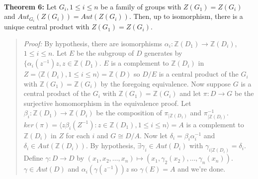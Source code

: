 \\
{\bf Theorem 6:}
Let $G_i, 1 \le i \le n$ be a family of groups with $Z(G_1)=Z(G_i)$ and
$Aut_{G_i}(Z(G_i))=Aut(Z(G_i))$.  Then, up to isomorphism, there is a unique
central product with $Z(G_1)=Z(G_i)$.
\begin{quote}
\emph{Proof:}
By hypothesis, there are isomorphisms
$\alpha_i : {\mathbb Z}( D_1 ) \rightarrow {\mathbb Z}( D_i )$, $1 \le i \le n$.
Let $E$ be the subgroup of $D$ generates by $\{ \alpha_i (z^{-1})z, z \in {\mathbb Z}(D_1 )$.
$E$ is a complement to ${\mathbb Z}(D_i)$ in $Z= \langle {\mathbb Z}(D_i), 1 \le i \le n \rangle = {\mathbb Z}(D)$ so
$D/E$ is a central product of the $G_i$ with ${\mathbb Z}(G_1 ) = {\mathbb Z}(G_i )$ by
the foregoing equivalence.  Now suppose $G$ is a central product of the $G_i$ with
${\mathbb Z}(G_1 ) = {\mathbb Z}(G_i )$ and let $\pi: D \rightarrow G$ be the surjective
homomorphism in the equivalence proof.  Let $\beta_i : {\mathbb Z}(D_1 ) \rightarrow {\mathbb Z}(D_i )$ be the composition of
$\pi_{|{\mathbb Z}(D_1 )}$ and $\pi_{|{\mathbb Z}(D_i )}^{-1}$.
$ker(\pi ) = \langle z \beta_i(Z^{-1} ): z \in {\mathbb Z}(D_1 ), 1 \le i \le n \rangle
= A$ is a complement
to ${\mathbb Z}(D_i )$ in $Z$ for each $i$ and $G \cong D/A$.  Now let $\delta_i = \beta_i \alpha_i^{-1}$ and $\delta_i \in Aut({\mathbb Z}(D_i ))$.  By
hypothesis, $\exists \gamma_i \in Aut( D_i )$ with $\gamma_{i | {\mathbb Z}(D_i )}= \delta_i$.
Define $\gamma : D \rightarrow D$ by $(x_1 , x_2 , \ldots , x_n ) \mapsto
(x_1 , \gamma_2(x_2), \ldots , \gamma_n(x_n))$.  $\gamma \in Aut(D)$ and
$\alpha_i(\gamma (z^{-1})) z$ so $\gamma(E)=A$ and we're done.
\end{quote}
